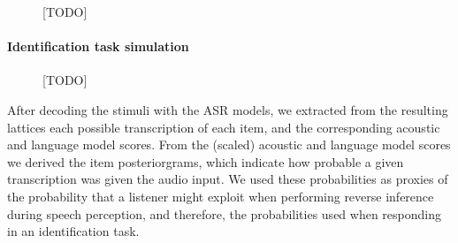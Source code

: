 {\begin{figure}[htb]
    \centering
    \caption{{\color{red}[TODO]}}%
    \label{fig:k-epenth_G}
  \end{figure}
  
\paragraph{Identification task simulation}
\begin{figure}[htb]
  \centering
  \caption{{\color{red}[TODO]}}%
  \label{fig:k-epenth_align}
\end{figure}

After decoding the stimuli with the ASR models, we extracted from the resulting lattices each possible transcription of each item, and the corresponding acoustic and language model scores. %
From the (scaled) acoustic and language model scores we derived the item posteriorgrams, which indicate how probable a given transcription was given the audio input. We used these probabilities as proxies of the probability that a listener might exploit when performing reverse inference during speech perception, and therefore, the probabilities used when responding in an identification task. 

}
